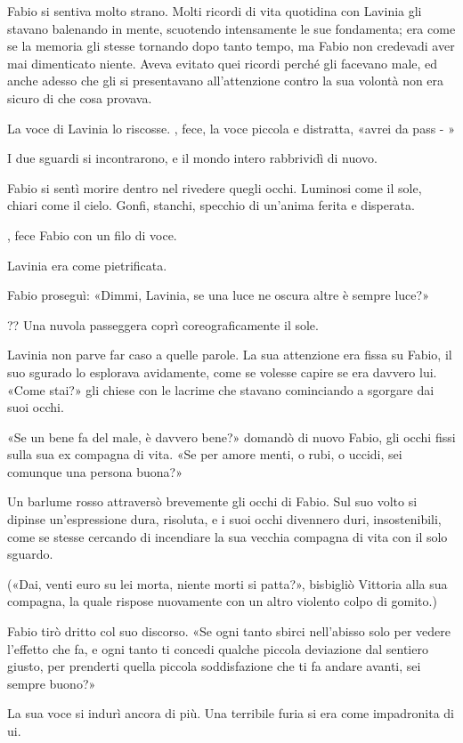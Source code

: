 Fabio si sentiva molto strano. Molti ricordi di vita quotidina con
Lavinia gli stavano balenando in mente, scuotendo intensamente le sue
fondamenta; era come se la memoria gli stesse tornando dopo tanto tempo,
ma Fabio non credevadi aver mai dimenticato niente. Aveva evitato quei
ricordi perché gli facevano male, ed anche adesso che gli si
presentavano all'attenzione contro la sua volontà non era sicuro di che
cosa provava.

La voce di Lavinia lo riscosse. , fece, la voce piccola e distratta,
«avrei da pass - »

I due sguardi si incontrarono, e il mondo intero rabbrividì di nuovo.

Fabio si sentì morire dentro nel rivedere quegli occhi. Luminosi come il
sole, chiari come il cielo. Gonfi, stanchi, specchio di un'anima ferita
e disperata.

, fece Fabio con un filo di voce.

Lavinia era come pietrificata.

Fabio proseguì: «Dimmi, Lavinia, se una luce ne oscura altre è
sempre luce?»

?? Una nuvola passeggera coprì coreograficamente il sole.

Lavinia non parve far caso a quelle parole. La sua attenzione era fissa
su Fabio, il suo sgurado lo esplorava avidamente, come se volesse capire
se era davvero lui. «Come stai?» gli chiese con
le lacrime che stavano cominciando a sgorgare dai suoi occhi.

«Se un bene fa del male, è davvero bene?» domandò
di nuovo Fabio, gli occhi fissi sulla sua ex compagna di vita.
«Se per amore menti, o rubi, o uccidi, sei comunque una
persona buona?»

Un barlume rosso attraversò brevemente gli occhi di Fabio. Sul suo volto
si dipinse un'espressione dura, risoluta, e i suoi occhi divennero duri,
insostenibili, come se stesse cercando di incendiare la sua vecchia
compagna di vita con il solo sguardo.

(«Dai, venti euro su lei morta, niente morti si
patta?», bisbigliò Vittoria alla sua compagna, la quale
rispose nuovamente con un altro violento colpo di gomito.)

Fabio tirò dritto col suo discorso. «Se ogni tanto sbirci
nell'abisso solo per vedere l'effetto che fa, e ogni tanto ti concedi
qualche piccola deviazione dal sentiero giusto, per prenderti quella
piccola soddisfazione che ti fa andare avanti, sei sempre
buono?»

La sua voce si indurì ancora di più. Una terribile furia si era come
impadronita di ui.


